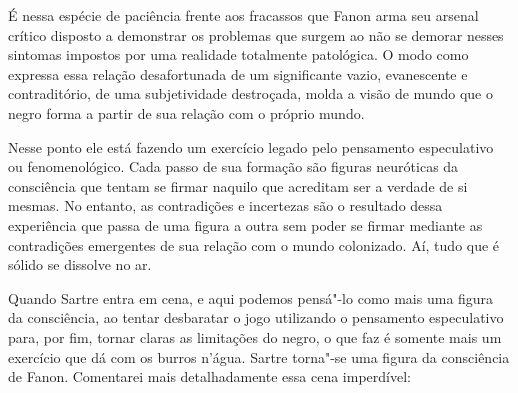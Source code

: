 É nessa espécie de paciência frente aos fracassos que Fanon arma seu
arsenal crítico disposto a demonstrar os problemas que surgem ao não se
demorar nesses sintomas impostos por uma realidade totalmente
patológica. O modo como expressa essa relação desafortunada de um
significante vazio, evanescente e contraditório, de uma subjetividade
destroçada, molda a visão de mundo que o negro forma a partir de sua
relação com o próprio mundo.

Nesse ponto ele está fazendo um exercício legado pelo pensamento
especulativo ou fenomenológico. Cada passo de sua formação são figuras
neuróticas da consciência que tentam se firmar naquilo que acreditam ser
a verdade de si mesmas. No entanto, as contradições e incertezas são o
resultado dessa experiência que passa de uma figura a outra sem poder se
firmar mediante as contradições emergentes de sua relação com o mundo
colonizado. Aí, tudo que é sólido se dissolve no ar.

Quando Sartre entra em cena, e aqui podemos pensá"-lo como mais uma
figura da consciência, ao tentar desbaratar o jogo utilizando o
pensamento especulativo para, por fim, tornar claras as limitações do
negro, o que faz é somente mais um exercício que dá com os burros
n'água. Sartre torna"-se uma figura da consciência de Fanon. Comentarei
mais detalhadamente essa cena imperdível:

